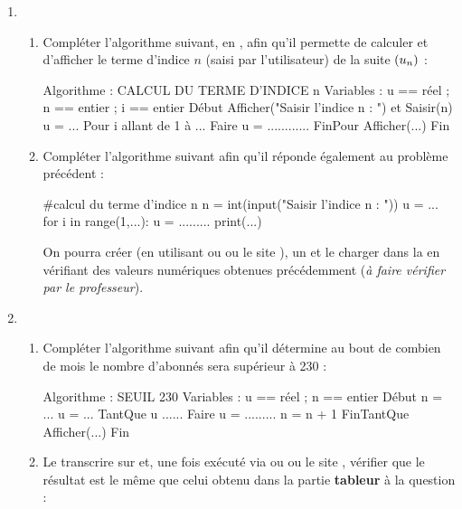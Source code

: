\documentclass[a4paper,11pt]{article}
\begin{document}
\begin{cmanip}
\vspace{-0.4cm}
\begin{enumerate}[leftmargin=*]
	\item 
	\begin{enumerate}
		\item Compléter l'algorithme suivant, en , afin qu'il permette de calculer et d'afficher le terme d'indice $n$ (saisi par l'utilisateur) de la suite $\left( u_n \right)$ : \vspace{-0.05cm}
\begin{envpseudocode}[12cm][center]
Algorithme : CALCUL DU TERME D'INDICE n
Variables : u == réel ; n == entier ; i == entier
Début
	Afficher("Saisir l'indice n : ") et Saisir(n)
	u = ...
	Pour i allant de 1 à ... Faire
		u = ............
	FinPour
	Afficher(...)
Fin
\end{envpseudocode}
		\item Compléter l'algorithme \calgpython{} suivant afin qu'il réponde également au problème précédent : \vspace{-0.05cm}
		\begin{envpython}[12cm]
			#calcul du terme d'indice n
			n = int(input("Saisir l'indice n : "))
			u = ...
			for i in range(1,...):
				u = .........
			print(...)
		\end{envpython}
		On pourra créer (en utilisant  ou  ou le site ), un  et le charger dans la  en vérifiant des valeurs numériques obtenues précédemment (\textit{à faire vérifier par le professeur}).
	\end{enumerate}
	\item
	\begin{enumerate}
		\item Compléter l'algorithme suivant afin qu'il détermine au bout de combien de mois le nombre d'abonnés sera supérieur à 230 : \vspace{-0.25cm}
\begin{envpseudocode}[12cm][center]
Algorithme : SEUIL 230
Variables : u == réel ; n == entier
Début
	n = ...
	u = ...
	TantQue u ...... Faire
		u = .........
		n = n + 1
	FinTantQue
	Afficher(...)
Fin
\end{envpseudocode}
	\item Le transcrire sur \calgpython{} et, une fois exécuté via  ou  ou le site , vérifier que le résultat est le même que celui obtenu dans la partie \textbf{tableur} à la question  : \vspace{-0.05cm}

\end{enumerate}
\end{enumerate}
\end{cmanip}
\end{document}
